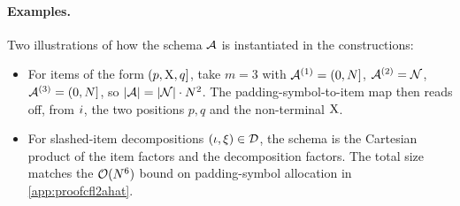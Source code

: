 \documentclass{article}
\begin{document}
\paragraph{Examples.}
Two illustrations of how the schema ${{{{ \mathcal{A}}}}}$ is instantiated in the constructions:
\begin{itemize}
    \item For items of the form $(p, {{ \mathrm{X}}}, q]$, take $m = 3$ with ${{{{ \mathcal{A}}}}}^{(1)} = (0,{{ N}}]$, ${{{{ \mathcal{A}}}}}^{(2)} = {{ \mathcal{N}}}$, ${{{{ \mathcal{A}}}}}^{(3)} = (0,{{ N}}]$, so $\asetsize = |\nonterm| \cdot \idxn^2$. The padding-symbol-to-item map then reads off, from ${{ i}}$, the two positions $p, q$ and the non-terminal ${{ \mathrm{X}}}$.
    \item For slashed-item decompositions $({{ \iota}}, {{\xi}}) \in {{\mathcal{D}}}$, the schema is the Cartesian product of the item factors and the decomposition factors. The total size matches the ${{ \mathcal{O}}}({{ N}}^6)$ bound on padding-symbol allocation in \cref{app:proofcfl2ahat}.
\end{itemize}
\end{document}
